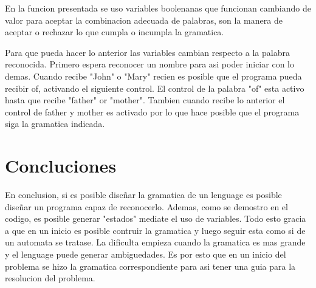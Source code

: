 \documentclass[conference]{IEEEtran}
\begin{document}
En la funcion presentada se uso variables  boolenanas que funcionan cambiando de valor para aceptar la combinacion adecuada de palabras, son la manera de aceptar o rechazar lo que cumpla o incumpla la gramatica.

Para que pueda hacer lo anterior las variables cambian respecto a la palabra reconocida. Primero espera reconocer un nombre para asi poder iniciar con lo demas. Cuando recibe "John" o "Mary" recien es posible que el programa pueda recibir of, activando el siguiente control. El control de la palabra "of" esta activo hasta que recibe "father" or "mother". Tambien cuando recibe lo anterior el control de father y mother es activado por lo que hace posible que el programa siga la gramatica indicada.

\section{Concluciones}

En conclusion, si es posible diseñar la gramatica de un lenguage es posible diseñar un programa capaz de reconocerlo. Ademas, como se demostro en el codigo, es posible generar "estados" mediate el uso de variables. Todo esto gracia a que en un inicio es posible contruir la gramatica y luego seguir esta como si de un automata se tratase. La dificulta empieza cuando la gramatica es mas grande y el lenguage puede generar ambiguedades. Es por esto que en un inicio del problema se hizo la gramatica correspondiente para asi tener una guia para la resolucion del problema.
\end{document}
